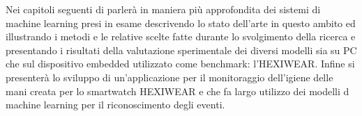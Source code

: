 Nei capitoli seguenti di parlerà in maniera più approfondita dei sistemi di machine learning presi in esame descrivendo lo stato dell'arte in questo ambito ed illustrando i metodi e le relative scelte fatte 
durante lo svolgimento della ricerca e presentando i risultati della valutazione sperimentale dei diversi modelli sia su PC che sul dispositivo embedded utilizzato come benchmark: l'HEXIWEAR. Infine si presenterà lo sviluppo di un'applicazione per il monitoraggio dell'igiene delle mani creata per lo smartwatch HEXIWEAR e che fa largo utilizzo dei modelli d machine learning per il riconoscimento degli eventi.